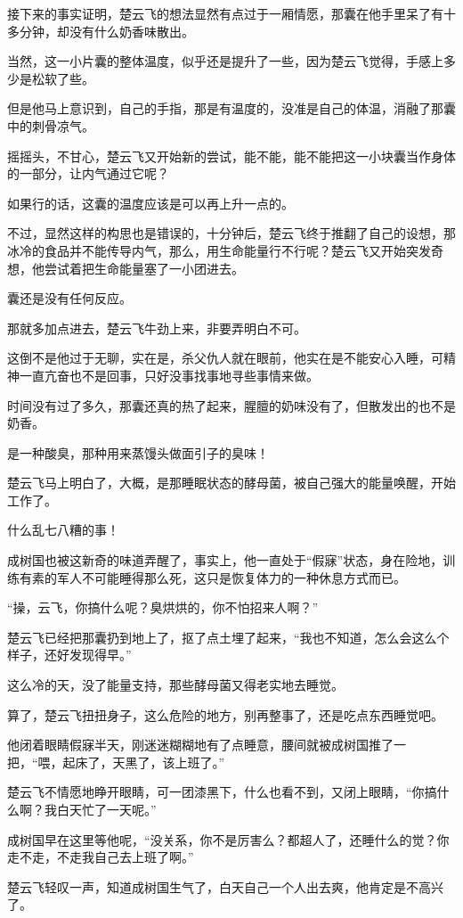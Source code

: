 接下来的事实证明，楚云飞的想法显然有点过于一厢情愿，那囊在他手里呆了有十多分钟，却没有什么奶香味散出。

当然，这一小片囊的整体温度，似乎还是提升了一些，因为楚云飞觉得，手感上多少是松软了些。

但是他马上意识到，自己的手指，那是有温度的，没准是自己的体温，消融了那囊中的刺骨凉气。

摇摇头，不甘心，楚云飞又开始新的尝试，能不能，能不能把这一小块囊当作身体的一部分，让内气通过它呢？

如果行的话，这囊的温度应该是可以再上升一点的。

不过，显然这样的构思也是错误的，十分钟后，楚云飞终于推翻了自己的设想，那冰冷的食品并不能传导内气，那么，用生命能量行不行呢？楚云飞又开始突发奇想，他尝试着把生命能量塞了一小团进去。

囊还是没有任何反应。

那就多加点进去，楚云飞牛劲上来，非要弄明白不可。

这倒不是他过于无聊，实在是，杀父仇人就在眼前，他实在是不能安心入睡，可精神一直亢奋也不是回事，只好没事找事地寻些事情来做。

时间没有过了多久，那囊还真的热了起来，腥膻的奶味没有了，但散发出的也不是奶香。

是一种酸臭，那种用来蒸馒头做面引子的臭味！

楚云飞马上明白了，大概，是那睡眠状态的酵母菌，被自己强大的能量唤醒，开始工作了。

什么乱七八糟的事！

成树国也被这新奇的味道弄醒了，事实上，他一直处于“假寐”状态，身在险地，训练有素的军人不可能睡得那么死，这只是恢复体力的一种休息方式而已。

“操，云飞，你搞什么呢？臭烘烘的，你不怕招来人啊？”

楚云飞已经把那囊扔到地上了，抠了点土埋了起来，“我也不知道，怎么会这么个样子，还好发现得早。”

这么冷的天，没了能量支持，那些酵母菌又得老实地去睡觉。

算了，楚云飞扭扭身子，这么危险的地方，别再整事了，还是吃点东西睡觉吧。

他闭着眼睛假寐半天，刚迷迷糊糊地有了点睡意，腰间就被成树国推了一把，“喂，起床了，天黑了，该上班了。”

楚云飞不情愿地睁开眼睛，可一团漆黑下，什么也看不到，又闭上眼睛，“你搞什么啊？我白天忙了一天呢。”

成树国早在这里等他呢，“没关系，你不是厉害么？都超人了，还睡什么的觉？你走不走，不走我自己去上班了啊。”

楚云飞轻叹一声，知道成树国生气了，白天自己一个人出去爽，他肯定是不高兴了。

